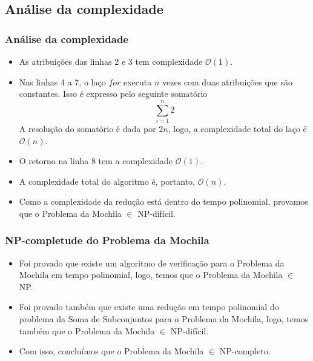 \documentclass{beamer}
\begin{document}
\subsection{Análise da complexidade}
\begin{frame}
\frametitle{Análise da complexidade}
    \begin{itemize}
        \item As atribuições das linhas 2 e 3 tem complexidade $\mathcal{O}(1)$.

        \item Nas linhas 4 a 7, o laço $for$ executa $n$ vezes com duas atribuições que são constantes. Isso é expresso pelo seguinte somatório
         \begin{equation*}
            \sum_{i=1}^{n} 2
         \end{equation*}
        A resolução do somatório é dada por $2n$, logo, a complexidade total do laço é $\mathcal{O}(n)$.
        \item O retorno na linha 8 tem a complexidade $\mathcal{O}(1)$.
        \item A complexidade total do algoritmo é, portanto, $\mathcal{O}(n)$.
        \item Como a complexidade da redução está dentro do tempo polinomial, provamos que o Problema da Mochila $\in$ NP-difícil.
    \end{itemize}
\end{frame}

\begin{frame}
\frametitle{NP-completude do Problema da Mochila}
    \begin{itemize}
        \item Foi provado que existe um algoritmo de verificação para o Problema da Mochila em tempo polinomial, logo, temos que o Problema da Mochila $\in$ NP.
        \item Foi provado também que existe uma redução em tempo polinomial do problema da Soma de Subconjuntos para o Problema da Mochila, logo, temos também que o Problema da Mochila $\in$ NP-difícil.
        \item Com isso, concluímos que o Problema da Mochila $\in$ NP-completo.
    \end{itemize}
\end{frame}
\end{document}
